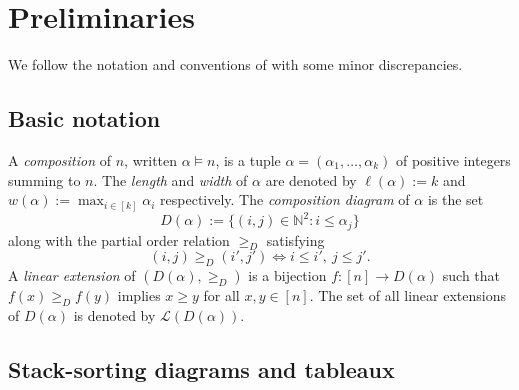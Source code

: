 \documentclass[12pt]{amsart}
\theoremstyle{definition}
\begin{document}
\section{Preliminaries}\label{sec:prelim}

We follow the notation and conventions of \cite{zhang26} with some minor discrepancies.

\subsection*{Basic notation}

A \emph{composition} of $n$, written $\alpha\models n$, is a tuple $\alpha=(\alpha_1,\ldots,\alpha_k)$ of positive integers summing to $n$. The \emph{length} and \emph{width} of $\alpha$ are denoted by $\ell(\alpha):=k$ and $w(\alpha):=\max_{i\in[k]}\alpha_i$ respectively. The \emph{composition diagram} of $\alpha$ is the set \[D(\alpha):=\{(i,j)\in\mathbb{N}^2:i\le\alpha_j\}\] along with the partial order relation $\ge_{D}$ satisfying \[(i,j)\ge_D(i',j') \iff i\le i',\ j\le j'.\] A \emph{linear extension} of $(D(\alpha),\ge_D)$ is a bijection $f:[n]\to D(\alpha)$ such that $f(x)\ge_D f(y)$ implies $x\ge y$ for all $x,y\in [n]$. The set of all linear extensions of $D(\alpha)$ is denoted by $\mathcal{L}(D(\alpha))$.
\subsection*{Stack-sorting diagrams and tableaux}
\end{document}
